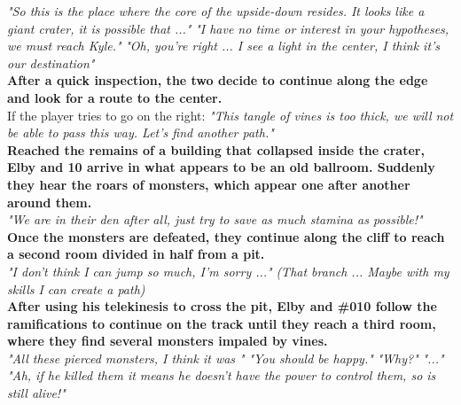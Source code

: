 \begin{dialogue}
	
	  \textit{"So this is the place where the core of the upside-down resides. It looks like a giant crater, it is possible that ..."}
	 \textit{"I have no time or interest in your hypotheses, we must reach Kyle."}
	 \textit{"Oh, you're right ... I see a light in the center, I think it's our destination"}\\
	
	\textbf{After a quick inspection, the two decide to continue along the edge and look for a route to the center.}\\
	
	If the player tries to go on the right:
	 \textit{"This tangle of vines is too thick, we will not be able to pass this way. Let's find another path."}\\
	
	\textbf{Reached the remains of a building that collapsed inside the crater, Elby and 10 arrive in what appears to be
an old ballroom. Suddenly they hear the roars of monsters, which appear one after another around them.}\\
	
	
	  \textit{"We are in their den after all, just try to save as much stamina as possible!"}\\
	
	\textbf{Once the monsters are defeated, they continue along the cliff to reach a second room divided in half
from a pit.}\\
	
	 \textit{"I don't think I can jump so much, I'm sorry ..."}
	 \textit{(That branch ... Maybe with my skills I can create a path)}\\
	
	\textbf{After using his telekinesis to cross the pit, Elby and \#010 follow the ramifications to continue on the track until they reach a third room, where they find several monsters impaled by vines.}\\
	
	
	 \textit{"All these pierced monsters, I think it was "}
	 \textit{"You should be happy."}
	 \textit{"Why?"}
	 \textit{"..."}
	 \textit{"Ah, if he killed them it means he doesn't have the power to control them, so  is still alive!"}
	 \\
	

\end{dialogue}
